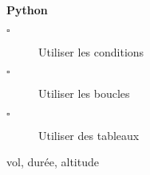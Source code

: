\begin{titre}[Trigonométrie]

\end{titre}


\begin{CpsCol}
\textbf{Python}
\begin{description}
\item[$\square$] Utiliser les conditions
\item[$\square$] Utiliser les boucles
\item[$\square$] Utiliser des tableaux
\end{description}
\end{CpsCol}

vol, durée, altitude



